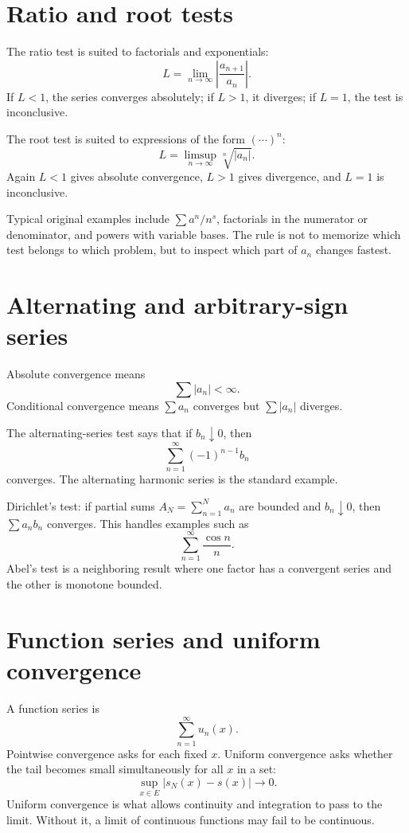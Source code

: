 \section{Ratio and root tests}

The ratio test is suited to factorials and exponentials:
\[
  L=\lim_{n\to\infty}\left|\frac{a_{n+1}}{a_n}\right|.
\]
If $L<1$, the series converges absolutely; if $L>1$, it diverges; if $L=1$, the test is inconclusive.

The root test is suited to expressions of the form $(\cdots)^n$:
\[
  L=\limsup_{n\to\infty}\sqrt[n]{|a_n|}.
\]
Again $L<1$ gives absolute convergence, $L>1$ gives divergence, and $L=1$ is inconclusive.

Typical original examples include $\sum a^n/n^s$, factorials in the numerator or denominator, and powers with variable bases.  The rule is not to memorize which test belongs to which problem, but to inspect which part of $a_n$ changes fastest.

\section{Alternating and arbitrary-sign series}

Absolute convergence means
\[
  \sum |a_n|<\infty.
\]
Conditional convergence means $\sum a_n$ converges but $\sum |a_n|$ diverges.

The alternating-series test says that if $b_n\downarrow0$, then
\[
  \sum_{n=1}^{\infty}(-1)^{n-1}b_n
\]
converges.  The alternating harmonic series is the standard example.

Dirichlet's test: if partial sums $A_N=\sum_{n=1}^N a_n$ are bounded and $b_n\downarrow0$, then $\sum a_nb_n$ converges.  This handles examples such as
\[
  \sum_{n=1}^{\infty}\frac{\cos n}{n}.
\]
Abel's test is a neighboring result where one factor has a convergent series and the other is monotone bounded.

\section{Function series and uniform convergence}

A function series is
\[
  \sum_{n=1}^{\infty}u_n(x).
\]
Pointwise convergence asks for each fixed $x$.  Uniform convergence asks whether the tail becomes small simultaneously for all $x$ in a set:
\[
  \sup_{x\in E}|s_N(x)-s(x)|\to0.
\]
Uniform convergence is what allows continuity and integration to pass to the limit.  Without it, a limit of continuous functions may fail to be continuous.

